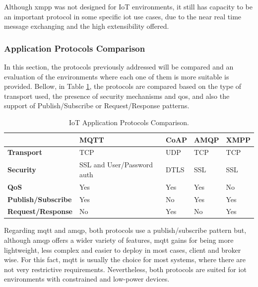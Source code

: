Although \ac{xmpp} was not designed for IoT environments, it still has capacity to be an important protocol in some specific \ac{iot} use cases, due to the near real time message exchanging and the high extensibility offered.

\subsubsection{Application Protocols Comparison}

In this section, the protocols previously addressed will be compared and an evaluation of the environments where each one of them is more suitable is provided. Bellow, in Table \ref{iotapplayer}, the protocols are compared based on the type of transport used, the presence of security mechanisms and \ac{qos}, and also the support of Publish/Subscribe or Request/Response patterns.

\begin{table}[]
	\centering
	\begin{tabular}{|l|l|l|l|l|}
		\hline
		& \textbf{MQTT}              & \textbf{CoAP} & \textbf{AMQP} & \textbf{XMPP} \\ \hline
		\textbf{Transport}         & TCP                        & UDP           & TCP           & TCP           \\ \hline
		\textbf{Security}          & SSL and User/Password auth & DTLS          & SSL           & SSL           \\ \hline
		\textbf{QoS}               & Yes                        & Yes           & Yes           & No            \\ \hline
		\textbf{Publish/Subscribe} & Yes                        & No            & Yes           & Yes           \\ \hline
		\textbf{Request/Response}  & No                         & Yes           & No            & Yes           \\ \hline
	\end{tabular}
	\caption{IoT Application Protocols Comparison.}
	\label{iotapplayer}
\end{table}

Regarding \ac{mqtt} and \ac{amqp}, both protocols use a publish/subscribe pattern but, although \ac{amqp} offers a wider variety of features, \ac{mqtt} gains for being more lightweight, less complex and easier to deploy in most cases, client and broker wise. For this fact, \ac{mqtt} is usually the choice for most systems, where there are not very restrictive requirements. Nevertheless, both protocols are suited for \ac{iot} environments with constrained and low-power devices.


